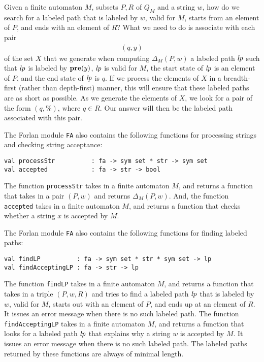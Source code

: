 Given a finite automaton $M$, subsets $P,R$ of $Q_M$ and a string $w$,
%
how do we search for a labeled path that is labeled by $w$, valid
for $M$, starts from an element of $P$, and ends with an element of $R$?
What we need to do is associate with each pair
\begin{gather*}
(q,y)
\end{gather*}
of the set $X$ that we generate when computing $\Delta_M(P,w)$ a
labeled path ${\it lp}$ such that ${\it lp}$ is labeled by $\mathbf{pre}(y)$, ${\it lp}$ is
valid for $M$, the start state of ${\it lp}$ is an element of $P$, and the
end state of ${\it lp}$ is $q$.  If we process the elements of $X$ in a
breadth-first (rather than depth-first) manner, this will ensure that
these labeled paths are as short as possible.  As we generate the
elements of $X$, we look for a pair of the form $(q,\%)$, where $q\in
R$.  Our answer will then be the labeled path associated with this
pair.

The Forlan module \texttt{FA}
%
also contains the following functions
for processing strings and checking string acceptance:
\begin{verbatim}
val processStr          : fa -> sym set * str -> sym set
val accepted            : fa -> str -> bool
\end{verbatim}
%
%
The function \texttt{processStr} takes in a finite automaton $M$,
and returns a function that takes in a pair $(P, w)$ and returns
$\Delta_M(P, w)$.
And, the function \texttt{accepted} takes in a finite automaton $M$,
and returns a function that checks whether a string $x$ is
accepted by $M$.

The Forlan module \texttt{FA}
%
also contains the following functions for finding labeled paths:
\begin{verbatim}
val findLP          : fa -> sym set * str * sym set -> lp
val findAcceptingLP : fa -> str -> lp
\end{verbatim}
%
%
The function \texttt{findLP} takes in a finite automaton $M$, and
returns a function that takes in a triple $(P,w,R)$ and tries
to find a labeled path ${\it lp}$ that is labeled by $w$, valid for $M$,
starts out with an element of $P$, and ends up at an element of $R$.
It issues an error message when there is no such labeled path.
The function \texttt{findAcceptingLP} takes in a finite automaton $M$,
and returns a function that looks for a labeled path ${\it lp}$ that
explains why a string $w$ is accepted by $M$.  It issues an error
message when there is no such labeled path.  The labeled paths
returned by these functions are always of minimal length.

